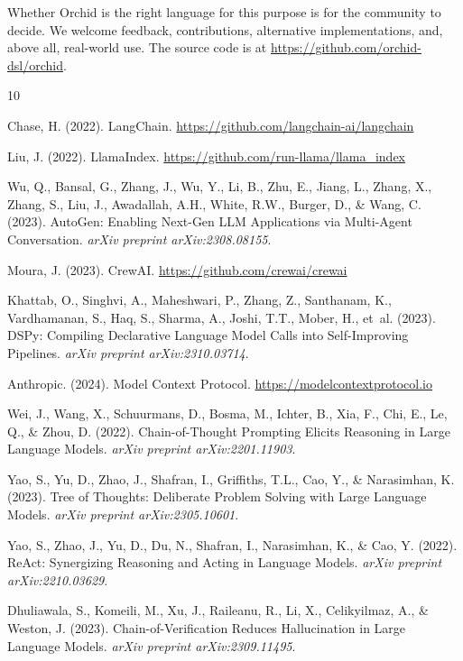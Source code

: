 \documentclass[11pt,a4paper]{article}
\begin{document}
Whether Orchid is the right language for this purpose is for the community to decide. We welcome feedback, contributions, alternative implementations, and, above all, real-world use. The source code is at \url{https://github.com/orchid-dsl/orchid}.



\begin{thebibliography}{10}

Chase, H. (2022).
\newblock LangChain.
\newblock \url{https://github.com/langchain-ai/langchain}

Liu, J. (2022).
\newblock LlamaIndex.
\newblock \url{https://github.com/run-llama/llama_index}

Wu, Q., Bansal, G., Zhang, J., Wu, Y., Li, B., Zhu, E., Jiang, L., Zhang, X., Zhang, S., Liu, J., Awadallah, A.H., White, R.W., Burger, D., \& Wang, C. (2023).
\newblock AutoGen: Enabling Next-Gen LLM Applications via Multi-Agent Conversation.
\newblock \emph{arXiv preprint arXiv:2308.08155}.

Moura, J. (2023).
\newblock CrewAI.
\newblock \url{https://github.com/crewai/crewai}

Khattab, O., Singhvi, A., Maheshwari, P., Zhang, Z., Santhanam, K., Vardhamanan, S., Haq, S., Sharma, A., Joshi, T.T., Mober, H., et~al. (2023).
\newblock DSPy: Compiling Declarative Language Model Calls into Self-Improving Pipelines.
\newblock \emph{arXiv preprint arXiv:2310.03714}.

Anthropic. (2024).
\newblock Model Context Protocol.
\newblock \url{https://modelcontextprotocol.io}

Wei, J., Wang, X., Schuurmans, D., Bosma, M., Ichter, B., Xia, F., Chi, E., Le, Q., \& Zhou, D. (2022).
\newblock Chain-of-Thought Prompting Elicits Reasoning in Large Language Models.
\newblock \emph{arXiv preprint arXiv:2201.11903}.

Yao, S., Yu, D., Zhao, J., Shafran, I., Griffiths, T.L., Cao, Y., \& Narasimhan, K. (2023).
\newblock Tree of Thoughts: Deliberate Problem Solving with Large Language Models.
\newblock \emph{arXiv preprint arXiv:2305.10601}.

Yao, S., Zhao, J., Yu, D., Du, N., Shafran, I., Narasimhan, K., \& Cao, Y. (2022).
\newblock ReAct: Synergizing Reasoning and Acting in Language Models.
\newblock \emph{arXiv preprint arXiv:2210.03629}.

Dhuliawala, S., Komeili, M., Xu, J., Raileanu, R., Li, X., Celikyilmaz, A., \& Weston, J. (2023).
\newblock Chain-of-Verification Reduces Hallucination in Large Language Models.
\newblock \emph{arXiv preprint arXiv:2309.11495}.

\end{thebibliography}
\end{document}
